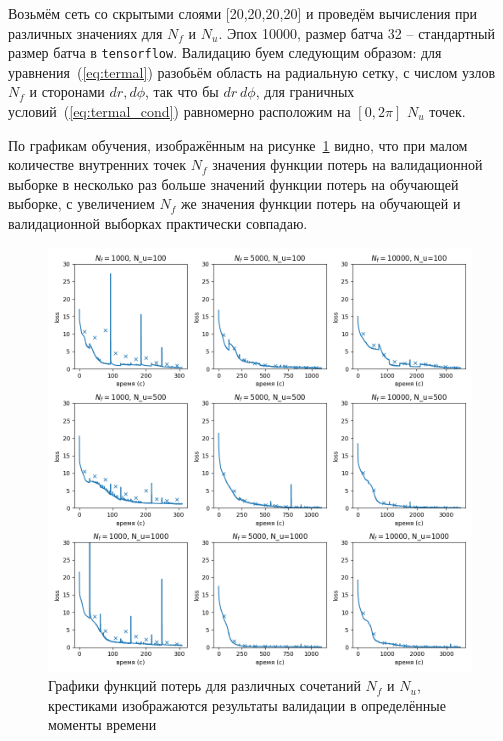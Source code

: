 \documentclass[a4paper,14pt]{extarticle} %
\begin{document}
Возьмём сеть со скрытыми слоями [20,20,20,20] и проведём вычисления при различных значениях для $N_f$ и $N_u$. Эпох 10000, размер батча 32 -- стандартный размер батча в \texttt{tensorflow}. Валидацию буем следующим образом: для уравнения~(\ref{eq:termal}) разобьём область на радиальную сетку, с числом узлов $N_f$ и сторонами $dr, d\phi$, так что бы $dr~d\phi$, для граничных условий~(\ref{eq:termal_cond}) равномерно расположим на $[0, 2\pi]$ $N_u$ точек.

По графикам обучения, изображённым на рисунке~\ref{fig:termal_loss} видно, что при малом количестве внутренних точек $N_f$ значения функции потерь на валидационной выборке в несколько раз больше значений функции потерь на обучающей выборке, с увеличением $N_f$ же значения функции потерь на обучающей и валидационной выборках практически совпадаю.

\begin{figure}[htb!]
    \includegraphics[width=\textwidth]{../plots/termal/loss l = (20x4) Nf=[1000, 5000, 10000] Nu=[100, 500, 1000].png}
    \caption{Графики функций потерь для различных сочетаний $N_f$ и $N_u$, крестиками изображаются результаты валидации в определённые моменты времени}
    \label{fig:termal_loss}
\end{figure}
\end{document}
